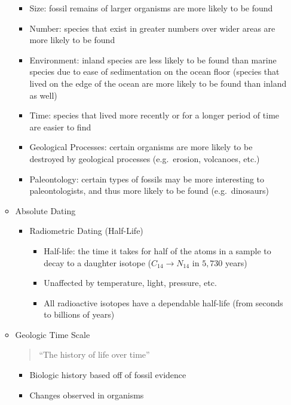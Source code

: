 \documentclass[12pt]{article}
\begin{document}
\begin{itemize}
\begin{itemize}
\begin{itemize}
                \item Size: fossil remains of larger organisms are more likely to be found
                \item Number: species that exist in greater numbers over wider areas are more likely to be found
                \item Environment: inland species are less likely to be found than marine species due to ease of sedimentation on the ocean floor (species that lived on the edge of the ocean are more likely to be found than inland as well)
                \item Time: species that lived more recently or for a longer period of time are easier to find
                \item Geological Processes: certain organisms are more likely to be destroyed by geological processes (e.g.\ erosion, volcanoes, etc.)
                \item Paleontology: certain types of fossils may be more interesting to paleontologists, and thus more likely to be found (e.g.\ dinosaurs)
            \end{itemize}
            \item Absolute Dating
            \begin{itemize}
                \item Radiometric Dating (Half-Life)
                \begin{itemize}
                    \item Half-life: the time it takes for half of the atoms in a sample to decay to a daughter isotope ($C_{14} \rightarrow N_{14}$ in $5,730$ years)
                    \item Unaffected by temperature, light, pressure, etc.
                    \item All radioactive isotopes have a dependable half-life (from seconds to billions of years)
                \end{itemize}
            \end{itemize}
            \item Geologic Time Scale
            \begin{quote}
                ``The history of life over time''
            \end{quote}
            \begin{itemize}
                \item Biologic history based off of fossil evidence
                \item Changes observed in organisms

\end{itemize}
\end{itemize}
\end{itemize}
\end{document}

